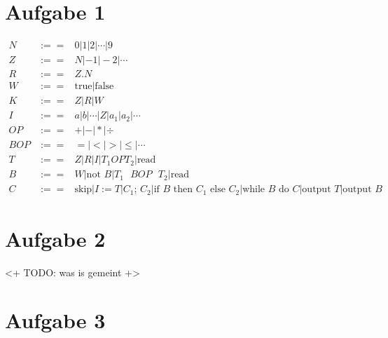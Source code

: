 




\newcommand{\nr}{1}


\section*{Aufgabe 1}
\begin{eqnarray}
N &:==& 0 | 1 | 2 | \cdots | 9 \\
Z &:==& N | -1 | -2 | \cdots \\
R &:==& Z . N \\
W &:==& \text{true} | \text{false} \\
K &:==& Z | R | W \\
I &:==& a | b | \cdots | Z | a_1 | a_2 | \cdots \\
OP &:==& + | - | * | ÷ \\
BOP &:==& = | < | > | \leq | \cdots \\
T &:==& Z | R | I | T_1 OP T_2 | \text{read} \\
B &:==& W | \text{not $B$} | \text{$T_1$ $BOP$ $T_2$}  | \text{read}\\
C &:==& \text{skip} | I:=T | \text{$C_1$; $C_2$} | \text{if $B$ then $C_1$ else $C_2$} | 
        \text{while $B$ do $C$} | \text{output $T$} | \text{output $B$}
\end{eqnarray}

\section*{Aufgabe 2}
<+ TODO: was is gemeint +>

\section*{Aufgabe 3}


